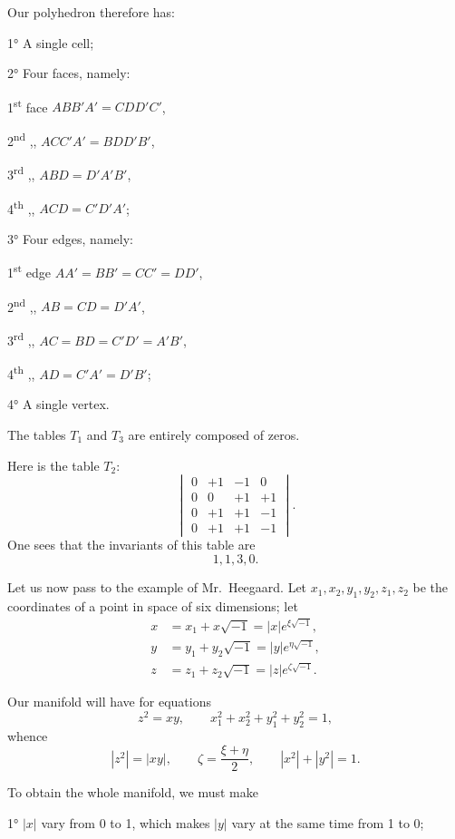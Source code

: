 \documentclass{article}
\begin{document}
Our polyhedron therefore has:

1° A single cell;

2° Four faces, namely:

1\textsuperscript{st} face $ABB'A' = CDD'C'$,

2\textsuperscript{nd} ,, $ACC'A' = BDD'B'$,

3\textsuperscript{rd} ,, $ABD = D'A'B'$,

4\textsuperscript{th} ,, $ACD = C'D'A'$;

3° Four edges, namely:

1\textsuperscript{st} edge $AA' = BB' = CC' = DD'$,

2\textsuperscript{nd} ,, $AB = CD = D'A'$,

3\textsuperscript{rd} ,, $AC = BD = C'D' = A'B'$,

4\textsuperscript{th} ,, $AD = C'A' = D'B'$;

4° A single vertex.

The tables $T_{1}$ and $T_{3}$ are entirely composed of zeros.

Here is the table $T_{2}$:
\[ \begin{vmatrix} 0 & +1 & -1 & 0 \\[1ex] 0 & 0 & +1 & +1 \\[1ex] 0 & +1 & +1 & -1 \\[1ex] 0 & +1 & +1 & -1 \end{vmatrix}. \]
One sees that the invariants of this table are
\[ 1, 1, 3, 0. \]

Let us now pass to the example of Mr.~Heegaard. Let $x_{1}, x_{2}, y_{1}, y_{2}, z_{1}, z_{2}$ be the coordinates of a point in space of six dimensions; let
\[ \begin{aligned} x &= x_{1} + x\sqrt{-1} = |x| e^{\xi\sqrt{-1}},\\ y &= y_{1} + y_{2}\sqrt{-1} = |y| e^{\eta\sqrt{-1}},\\ z &= z_{1} + z_{2}\sqrt{-1} = |z| e^{\zeta\sqrt{-1}}. \end{aligned} \]

Our manifold will have for equations
\[ z^{2} = xy, \qquad x^{2}_{1} + x^{2}_{2} + y^{2}_{1} + y^{2}_{2} = 1, \]
whence
\[ |z^{2}| = |xy|, \qquad \zeta = \frac{\xi+\eta}{2}, \qquad |x^{2}| + |y^{2}| = 1. \]

To obtain the whole manifold, we must make

1° $|x|$ vary from 0 to 1, which makes $|y|$ vary at the same time from 1 to 0;
\end{document}

